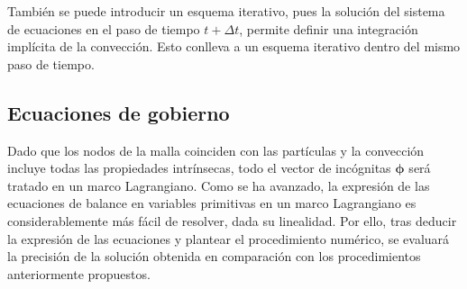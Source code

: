 También se puede introducir un esquema iterativo, pues la solución del sistema de ecuaciones en el paso de tiempo $t+\Delta t$, permite definir una integración implícita de la convección. Esto conlleva a un esquema iterativo dentro del mismo paso de tiempo.

\subsection{Ecuaciones de gobierno}

Dado que los nodos de la malla coinciden con las partículas y la convección incluye todas las propiedades intrínsecas, todo el vector de incógnitas $\bm\phi$ será tratado en un marco Lagrangiano.
Como se ha avanzado, la expresión de las ecuaciones de balance en variables primitivas en un marco Lagrangiano es considerablemente más fácil de resolver, dada su linealidad. Por ello, tras deducir la expresión de las ecuaciones y plantear el procedimiento numérico, se evaluará la precisión de la solución obtenida en comparación con los procedimientos anteriormente propuestos.


